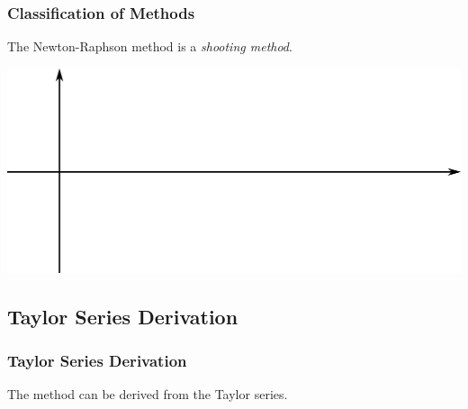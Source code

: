 \documentclass[fleqn]{beamer} %
\newcommand{\sectionIIsubsectionItitle}{Classification of Methods}
\newcommand{\sectionIIsubsectionIItitle}{Taylor Series Derivation}
\begin{document}
\begin{frame}[label=sectionIIsubsectionI]
				\btVFill
			\end{frame}	

			\begin{frame}[label=sectionIIsubsectionI]
				\frametitle{\sectionIIsubsectionItitle}
				\bigskip

				The Newton-Raphson method is a {\it shooting method}. \vspace{5mm}

				\includegraphics[scale=.40]{images/topic3_fig1.png}
				
				\btVFill
			\end{frame}

		\subsection{\sectionIIsubsectionIItitle}\label{sectionIIsubsectionII}

			\begin{frame}
				\frametitle{\sectionIIsubsectionIItitle}
				\bigskip

				The method can be derived from the Taylor series. \vspace{5mm} \\
	
				 \vspace{50mm}
		
				\btVFill 
			\end{frame}	
\end{document}
